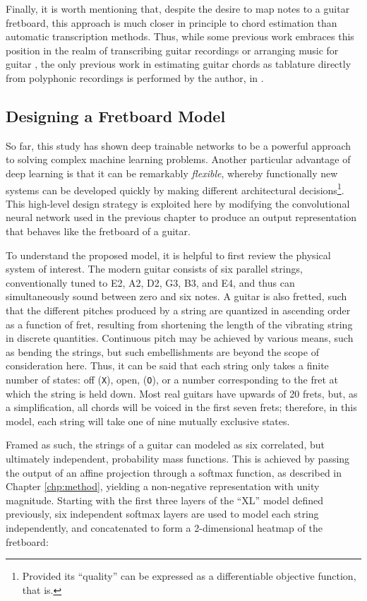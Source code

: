 Finally, it is worth mentioning that, despite the desire to map notes to a guitar fretboard, this approach is much closer in principle to chord estimation than automatic transcription methods.
Thus, while some previous work embraces this position in the realm of transcribing guitar recordings \cite{Barbancho2012Automatic} or arranging music for guitar \cite{Hori2013Input}, the only previous work in estimating guitar chords as tablature directly from polyphonic recordings is performed by the author, in \cite{Humphrey2014Music}.


\subsection{Designing a Fretboard Model}
\label{subsec:design}

So far, this study has shown deep trainable networks to be a powerful approach to solving complex machine learning problems.
Another particular advantage of deep learning is that it can be remarkably \emph{flexible}, whereby functionally new systems can be developed quickly by making different architectural decisions\footnote{
Provided its ``quality'' can be expressed as a differentiable objective function, that is.}.
This high-level design strategy is exploited here by modifying the convolutional neural network used in the previous chapter to produce an output representation that behaves like the fretboard of a guitar.

To understand the proposed model, it is helpful to first review the physical system of interest.
The modern guitar consists of six parallel strings, conventionally tuned to E2, A2, D2, G3, B3, and E4, and thus can simultaneously sound between zero and six notes.
A guitar is also fretted, such that the different pitches produced by a string are quantized in ascending order as a function of fret, resulting from shortening the length of the vibrating string in discrete quantities.
Continuous pitch may be achieved by various means, such as bending the strings, but such embellishments are beyond the scope of consideration here.
Thus, it can be said that each string only takes a finite number of states: off (\texttt{X}), open, (\texttt{O}), or a number corresponding to the fret at which the string is held down.
Most real guitars have upwards of 20 frets, but, as a simplification, all chords will be voiced in the first seven frets;
therefore, in this model, each string will take one of nine mutually exclusive states.

Framed as such, the strings of a guitar can modeled as six correlated, but ultimately independent, probability mass functions.
This is achieved by passing the output of an affine projection through a softmax function, as described in Chapter \ref{chp:method}, yielding a non-negative representation with unity magnitude.
Starting with the first three layers of the ``XL'' model defined previously, six independent softmax layers are used to model each string independently, and concatenated to form a 2-dimensional heatmap of the fretboard:

